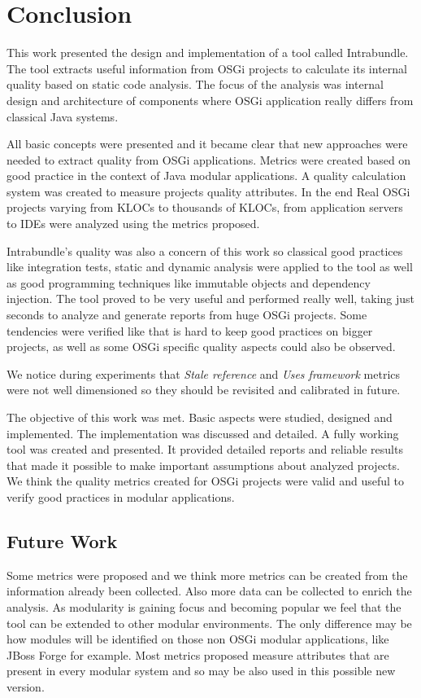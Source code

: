 \chapter{Conclusion}
This work presented the design and implementation of a tool called Intrabundle. The tool extracts useful information from OSGi projects to calculate its internal quality based on static code analysis. The focus of the analysis was internal design and architecture of components where OSGi application really differs from classical Java systems. 

All basic concepts were presented and it became clear that new approaches were needed to extract quality from OSGi applications. Metrics were created based on good practice in the context of Java modular applications. A quality calculation system was created to measure projects quality attributes. In the end Real OSGi projects varying from KLOCs to thousands of KLOCs, from application servers to IDEs were analyzed using the metrics proposed.

Intrabundle's quality was also a concern of this work so classical good practices like integration tests, static and dynamic analysis were applied to the tool as well as good programming techniques like immutable objects and dependency injection.      
The tool proved to be very useful and performed really well, taking just seconds to analyze and generate reports from huge OSGi projects. Some tendencies were verified like that is hard to keep good practices on bigger projects, as well as some OSGi specific quality aspects could also be observed. 

We notice during experiments that \emph{Stale reference} and \emph{Uses framework} metrics were not well dimensioned so they should be revisited and calibrated in future.

The objective of this work was met. Basic aspects were studied, designed and implemented. The implementation was discussed and detailed. A fully working tool was created and presented. It provided detailed reports and reliable results that made it possible to make important assumptions about analyzed projects. We think the quality metrics created for OSGi projects were valid and useful to verify good practices in modular applications. 

\section{Future Work}
Some metrics were proposed and we think more metrics can be created from the information already been collected. Also more data can be collected to enrich the analysis. 
As modularity is gaining focus and becoming popular we feel that the tool can be extended to other modular environments. The only difference may be how modules will be identified on those non OSGi modular applications, like JBoss Forge for example. Most metrics proposed measure attributes that are present in every modular system and so may be also used in this possible new version. 

